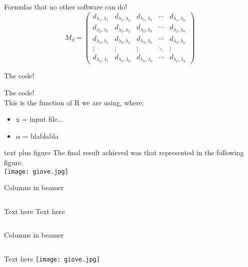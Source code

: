 \documentclass{beamer}
\begin{document}
\begin{frame}{Formulas that no other software can do!}
    \begin{equation}
    M_d=
    \begin{pmatrix}
    d_{\lambda_1,\lambda_1} & d_{\lambda_1,\lambda_2} & d_{\lambda_1,\lambda_3} & \cdots & d_{\lambda_1,\lambda_n} \\
    d_{\lambda_2,\lambda_1} & d_{\lambda_2,\lambda_2} & d_{\lambda_2,\lambda_3} & \cdots & d_{\lambda_2,\lambda_n} \\
    d_{\lambda_3,\lambda_1} & d_{\lambda_3,\lambda_2} & d_{\lambda_3,\lambda_3} & \cdots & d_{\lambda_3,\lambda_n} \\
    \vdots  & \vdots  & \vdots  & \ddots & \vdots  \\
    d_{\lambda_n,\lambda_1} & d_{\lambda_n,\lambda_2} & d_{\lambda_n,\lambda_3} & \cdots & d_{\lambda_n,\lambda_n}
    \end{pmatrix}
    \end{equation}
\end{frame}

\begin{frame}{The code!}
    
\end{frame}

\begin{frame}{The code!}
     \\
    \bigskip
    This is the function of R we are using, where:
    \begin{itemize}
        \item x = input file...
        \item $\alpha$ = blablabla
    \end{itemize}
\end{frame}

\begin{frame}{text plus figure}
    \centering
    The final result achieved was that represented in the following figure.\\
    \bigskip
    \texttt{[image: giove.jpg]}
\end{frame}

\begin{frame}{Columns in beamer}
    \begin{columns}
        \centering
        Text here
        \centering
        Text here
    \end{columns}
\end{frame}

\begin{frame}{Columns in beamer}
    \begin{columns}
        \centering
        Text here
        \centering
        \texttt{[image: giove.jpg]}
    \end{columns}
\end{frame}
\end{document}
